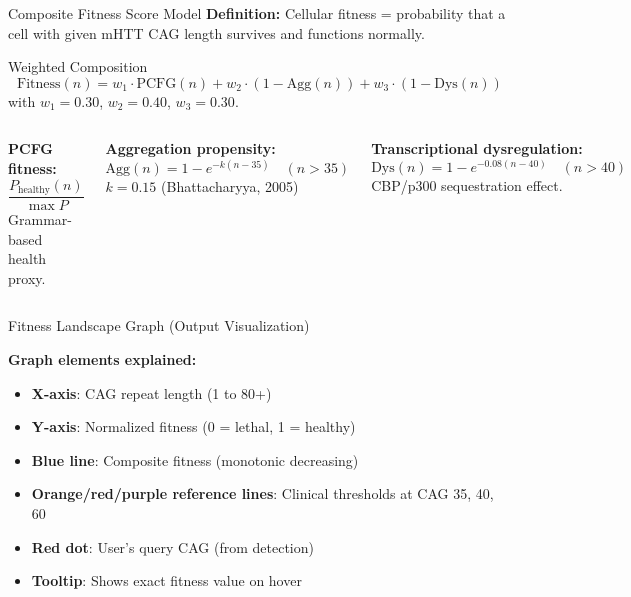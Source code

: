 \documentclass[aspectratio=169,11pt]{beamer}
\begin{document}
\begin{frame}{Composite Fitness Score Model}
    \textbf{Definition:} Cellular fitness = probability that a cell with given mHTT CAG length survives and functions normally.

    \begin{block}{Weighted Composition}
        \[
        \text{Fitness}(n) = w_1 \cdot \text{PCFG}(n) + w_2 \cdot (1 - \text{Agg}(n)) + w_3 \cdot (1 - \text{Dys}(n))
        \]
        with $w_1 = 0.30$, $w_2 = 0.40$, $w_3 = 0.30$.
    \end{block}

    \begin{columns}[T]
        \textbf{PCFG fitness:}
        \[
        \frac{P_{\text{healthy}}(n)}{\max P}
        \]
        Grammar-based health proxy.

        \textbf{Aggregation propensity:}
        \[
        \text{Agg}(n) = 1 - e^{-k(n-35)} \quad (n > 35)
        \]
        $k = 0.15$ (Bhattacharyya, 2005)

        \textbf{Transcriptional dysregulation:}
        \[
        \text{Dys}(n) = 1 - e^{-0.08(n-40)} \quad (n > 40)
        \]
        CBP/p300 sequestration effect.
    \end{columns}
\end{frame}

\begin{frame}{Fitness Landscape Graph (Output Visualization)}
    \begin{center}
    \end{center}

    \textbf{Graph elements explained:}
    \begin{itemize}
        \item \textbf{X-axis}: CAG repeat length (1 to 80+)
        \item \textbf{Y-axis}: Normalized fitness (0 = lethal, 1 = healthy)
        \item \textbf{Blue line}: Composite fitness (monotonic decreasing)
        \item \textbf{Orange/red/purple reference lines}: Clinical thresholds at CAG 35, 40, 60
        \item \textbf{Red dot}: User's query CAG (from detection)
        \item \textbf{Tooltip}: Shows exact fitness value on hover
    \end{itemize}
\end{frame}
\end{document}
